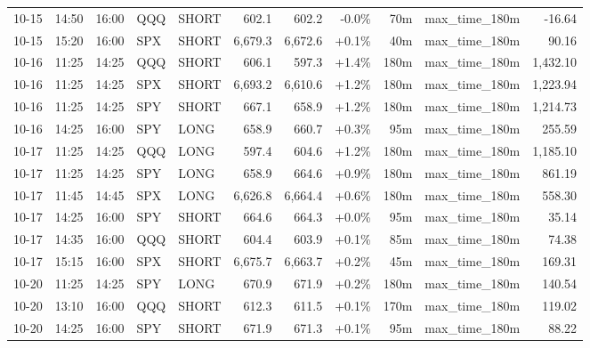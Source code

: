 \documentclass[11pt,a4paper,twoside]{article}
\begin{document}
\begin{center}
\begin{longtable}{>{\color{txtmain}}l l l l l r r r r >{\color{txtmain}}l r}
10-15 & 14:50 & 16:00 & QQQ & SHORT & 602.1 & 602.2 & \textcolor{lossred}{-0.0\%} & 70m & max\_time\_180m & \textcolor{lossred}{-16.64} \\
10-15 & 15:20 & 16:00 & SPX & SHORT & 6,679.3 & 6,672.6 & \textcolor{wingreen}{+0.1\%} & 40m & max\_time\_180m & \textcolor{wingreen}{90.16} \\
10-16 & 11:25 & 14:25 & QQQ & SHORT & 606.1 & 597.3 & \textcolor{wingreen}{+1.4\%} & 180m & max\_time\_180m & \textcolor{wingreen}{1,432.10} \\
10-16 & 11:25 & 14:25 & SPX & SHORT & 6,693.2 & 6,610.6 & \textcolor{wingreen}{+1.2\%} & 180m & max\_time\_180m & \textcolor{wingreen}{1,223.94} \\
10-16 & 11:25 & 14:25 & SPY & SHORT & 667.1 & 658.9 & \textcolor{wingreen}{+1.2\%} & 180m & max\_time\_180m & \textcolor{wingreen}{1,214.73} \\
10-16 & 14:25 & 16:00 & SPY & LONG & 658.9 & 660.7 & \textcolor{wingreen}{+0.3\%} & 95m & max\_time\_180m & \textcolor{wingreen}{255.59} \\
10-17 & 11:25 & 14:25 & QQQ & LONG & 597.4 & 604.6 & \textcolor{wingreen}{+1.2\%} & 180m & max\_time\_180m & \textcolor{wingreen}{1,185.10} \\
10-17 & 11:25 & 14:25 & SPY & LONG & 658.9 & 664.6 & \textcolor{wingreen}{+0.9\%} & 180m & max\_time\_180m & \textcolor{wingreen}{861.19} \\
10-17 & 11:45 & 14:45 & SPX & LONG & 6,626.8 & 6,664.4 & \textcolor{wingreen}{+0.6\%} & 180m & max\_time\_180m & \textcolor{wingreen}{558.30} \\
10-17 & 14:25 & 16:00 & SPY & SHORT & 664.6 & 664.3 & \textcolor{wingreen}{+0.0\%} & 95m & max\_time\_180m & \textcolor{wingreen}{35.14} \\
10-17 & 14:35 & 16:00 & QQQ & SHORT & 604.4 & 603.9 & \textcolor{wingreen}{+0.1\%} & 85m & max\_time\_180m & \textcolor{wingreen}{74.38} \\
10-17 & 15:15 & 16:00 & SPX & SHORT & 6,675.7 & 6,663.7 & \textcolor{wingreen}{+0.2\%} & 45m & max\_time\_180m & \textcolor{wingreen}{169.31} \\
10-20 & 11:25 & 14:25 & SPY & LONG & 670.9 & 671.9 & \textcolor{wingreen}{+0.2\%} & 180m & max\_time\_180m & \textcolor{wingreen}{140.54} \\
10-20 & 13:10 & 16:00 & QQQ & SHORT & 612.3 & 611.5 & \textcolor{wingreen}{+0.1\%} & 170m & max\_time\_180m & \textcolor{wingreen}{119.02} \\
10-20 & 14:25 & 16:00 & SPY & SHORT & 671.9 & 671.3 & \textcolor{wingreen}{+0.1\%} & 95m & max\_time\_180m & \textcolor{wingreen}{88.22} \\

\end{longtable}
\end{center}
\end{document}
